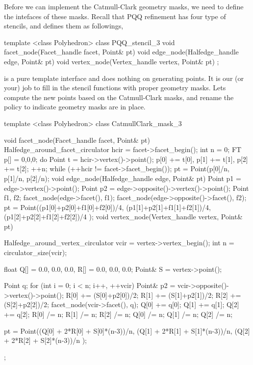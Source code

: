 Before we can implement the Catmull-Clark geometry masks, we need to 
define the intefaces of these masks. Recall that PQQ refinement has four
type of stencils, and  defines them as followings,
\begin{ccExampleCode}
template <class Polyhedron>
class PQQ_stencil_3 {
  void facet_node(Facet_handle facet, Point& pt) {}
  void edge_node(Halfedge_handle edge, Point& pt) {}
  void vertex_node(Vertex_handle vertex, Point& pt) {}
};
\end{ccExampleCode}

 is a pure template interface and does nothing on generating 
points. It is our (or your) job to fill in the stencil functions with
proper geometry masks. Lets compute the new points based on the Catmull-Clark
masks, and rename the policy to indicate geometry masks are in place.

\begin{ccExampleCode}
template <class Polyhedron>
class CatmullClark_mask_3 {
  void facet_node(Facet_handle facet, Point& pt) {
    Halfedge_around_facet_circulator hcir = facet->facet_begin();
    int n = 0;
    FT p[] = {0,0,0};
    do {
      Point t = hcir->vertex()->point();
      p[0] += t[0], p[1] += t[1], p[2] += t[2]; 
      ++n;
    } while (++hcir != facet->facet_begin());
    pt = Point(p[0]/n, p[1]/n, p[2]/n);
  }
  void edge_node(Halfedge_handle edge, Point& pt) {
    Point p1 = edge->vertex()->point();
    Point p2 = edge->opposite()->vertex()->point();
    Point f1, f2;
    facet_node(edge->facet(), f1);
    facet_node(edge->opposite()->facet(), f2);
    pt = Point((p1[0]+p2[0]+f1[0]+f2[0])/4,
               (p1[1]+p2[1]+f1[1]+f2[1])/4,
               (p1[2]+p2[2]+f1[2]+f2[2])/4 );
  }
  void vertex_node(Vertex_handle vertex, Point& pt) {
    Halfedge_around_vertex_circulator vcir = vertex->vertex_begin();
    int n = circulator_size(vcir);    

    float Q[] = {0.0, 0.0, 0.0}, R[] = {0.0, 0.0, 0.0};
    Point& S = vertex->point();
    
    Point q;
    for (int i = 0; i < n; i++, ++vcir) {
      Point& p2 = vcir->opposite()->vertex()->point();
      R[0] += (S[0]+p2[0])/2;
      R[1] += (S[1]+p2[1])/2;
      R[2] += (S[2]+p2[2])/2;
      facet_node(vcir->facet(), q);
      Q[0] += q[0];      
      Q[1] += q[1];      
      Q[2] += q[2];
    }
    R[0] /= n;    R[1] /= n;    R[2] /= n;
    Q[0] /= n;    Q[1] /= n;    Q[2] /= n;
      
    pt = Point((Q[0] + 2*R[0] + S[0]*(n-3))/n,
               (Q[1] + 2*R[1] + S[1]*(n-3))/n,
               (Q[2] + 2*R[2] + S[2]*(n-3))/n );
  }
};
\end{ccExampleCode}


